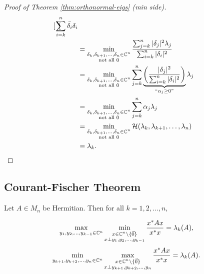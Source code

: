 \begin{proof}[Proof of Theorem \ref{thm:orthonormal-eigs} (min side)]
\begin{align*}
{\begin{bmatrix}
            \end{bmatrix}
        }
        {
            \sum_{i=k}^n \Bar{\delta_i}\delta_i
        } \\
    &=
    \min_{
        \substack{
            \delta_k, \delta_{k+1}, \dots, \delta_n \in \mathbb C^n \\
            \text{not all 0}
        }
    } \frac
        {\sum_{j=k}^n |\delta_j|^2 \lambda_j}
        {\sum_{i=k}^n |\delta_i|^2} \\
    &=
    \min_{
        \substack{
            \delta_k, \delta_{k+1}, \dots, \delta_n \in \mathbb C^n \\
            \text{not all 0}
        }
    } \sum_{j=k}^n 
        \underbrace{\left(
            \frac
                {|\delta_j|^2}
                {\sum_{i=k}^n |\delta_i|^2}
        \right)}_{``\alpha_j \geq 0"}
        \lambda_j \\
    &=
    \min_{
        \substack{
            \delta_k, \delta_{k+1}, \dots, \delta_n \in \mathbb C^n \\
            \text{not all 0}
        }
    } \sum_{j=k}^n \alpha_j \lambda_j \\
    &= \min_{
        \substack{
            \delta_k, \delta_{k+1}, \dots, \delta_n \in \mathbb C^n \\
            \text{not all 0}
        }
    } \mathcal{H}(\lambda_k, \lambda_{k+1}, \dots, \lambda_n) \\
    &= \lambda_k.
\end{align*}
\end{proof}

\subsection{Courant-Fischer Theorem}
\begin{theorem}
\label{thm:Courant-Fischer}
Let $A \in M_n$ be Hermitian. Then for all $k = 1, 2, \dots, n$,
\begin{multicols}{2}
\centering
\noindent \begin{align*}
    \max_{y_1, y_2, \dots, y_{k-1} \in \mathbb C^n}
    \min_{
        \substack{
            x \in \mathbb C^n \setminus \{\Vec{0}\} \\ 
            x \perp y_1, y_2, \dots, y_{k-1}}}
        \frac{x^*Ax}{x^*x} &= \lambda_k(A),
\end{align*}
\begin{align*}
    \min_{y_{k+1}, y_{k+2}, \dots, y_n \in \mathbb C^n}
    \max_{
        \substack{
            x \in \mathbb C^n \setminus \{\Vec{0}\} \\ 
            x \perp y_{k+1}, y_{k+2}, \dots, y_n}}
        \frac{x^*Ax}{x^*x} &= \lambda_k(A).
\end{align*}
\end{multicols}
\end{theorem}

